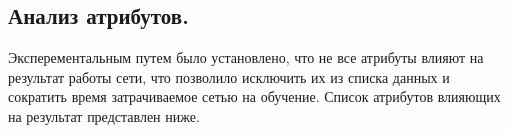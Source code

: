 \subsection{Анализ атрибутов.}
Эксперементальным путем было установлено, что не все атрибуты влияют на результат работы сети, что позволило исключить их из списка данных и сократить время затрачиваемое сетью на обучение. Список атрибутов влияющих на результат представлен ниже.
\begin{figure}[H]
\end{figure}
\newpage
